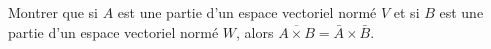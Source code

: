 \begin{exercice}\label{exoGeomAnal-0009}

	Montrer que si $A$ est une partie d'un espace vectoriel normé $V$ et si $B$ est une partie d'un espace vectoriel normé $W$, alors $\overline{ A\times B }=\bar A\times \bar B$.

\end{exercice}
